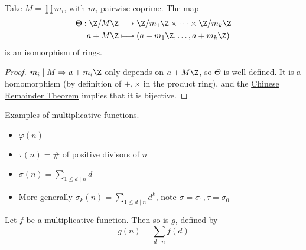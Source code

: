 \documentclass{article}
\begin{document}
\begin{nthm}
    Take $M = \prod m_i$, with $ m_i$ pairwise coprime.
    The map
    \begin{align*}
        \Theta : \Z/M\Z &\longrightarrow \Z/m_1\Z \times \cdots \times \Z / m_k \Z \\
                       a + M \Z &\longmapsto (a + m_1 \Z, \dotsc , a + m_k \Z )
    \end{align*}
    is an isomorphism of rings.
\end{nthm}

\begin{proof}
    $m_i \mid M \Rightarrow a+m_i \Z$ only depends on $a + M\Z$, so $\Theta$ is well-defined.
    It is a homomorphism (by definition of $+, \times$ in the product ring), and the \hyperlink{thm:crt}{Chinese Remainder Theorem} implies that it is bijective.
\end{proof}


\begin{eg}
    Examples of \hyperlink{def:multiplicativeFunction}{multiplicative functions}.
    \begin{itemize}
        \item $\varphi(n)$
        \item $\tau (n) = \#$ of positive divisors of  $n$
        \item $\sigma (n) = \sum_{1 \leq d \mid n} d$
        \item More generally $\sigma_k (n) = \sum_{1 \leq d \mid n} d^k$, note $\sigma = \sigma_1, \tau = \sigma_0$
    \end{itemize}
\end{eg}

\begin{nlemma}\label{lem:2_4}
    Let $f$ be a multiplicative function. Then so is $g$, defined by \begin{equation*} g(n) = \sum_{d \mid n} f(d) \end{equation*}
\end{nlemma}
\end{document}
